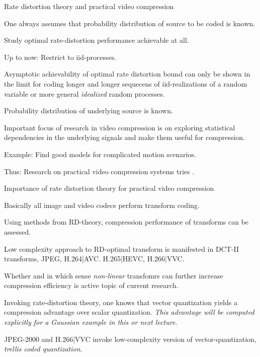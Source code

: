 \begin{frame}{Rate distortion theory and practical video compression} 
\bit
\item One always assumes that probability distribution of source to be coded is known. 
\item Study optimal rate-distortion performance achievable at all.
\item Up to now: Restrict to iid-processes.
\item Asymptotic achievability of optimal rate distortion bound can only be 
shown in the limit for coding longer and longer sequecens of iid-realizations of a random variable or more general 
\textit{idealized} random processes. 
\eit

\bit
\item Probability distribution of underlying source is  known. 
\item Important focus of research in video compression is on exploring statistical dependencies in the underlying signals and make them useful for compression.
\item Example: Find good models for complicated motion scenarios. 
\item Thus:  Research on practical video compression systems tries .
\eit 
\end{frame}

\begin{frame}{Importance of rate distortion theory for practical video compression}

\bit
\item Basically all image and video codecs perform transform coding. 
\item Using methods from RD-theory, compression performance of transforms 
can be assessed. 
\item Low complexity approach to RD-optimal transform is manifested in DCT-II transforms, JPEG, H.264|AVC. H.265|HEVC, H.266|VVC. 
\item Whether and in which sense \textit{non-linear} transfomrs can further increase compression efficiency is active topic of current research.
\eit
{}
\bit
\item Invoking rate-distortion theory, one knows that vector quantization yields a compression advantage over scalar quantization. \textit{This advantage will 
be computed explicitly for a Gaussian example in this or next lecture}. 
\item JPEG-2000 and H.266|VVC invoke low-complexity version of vector-quantization, \textit{trellis coded quantization}. 
\eit 
\end{frame}

